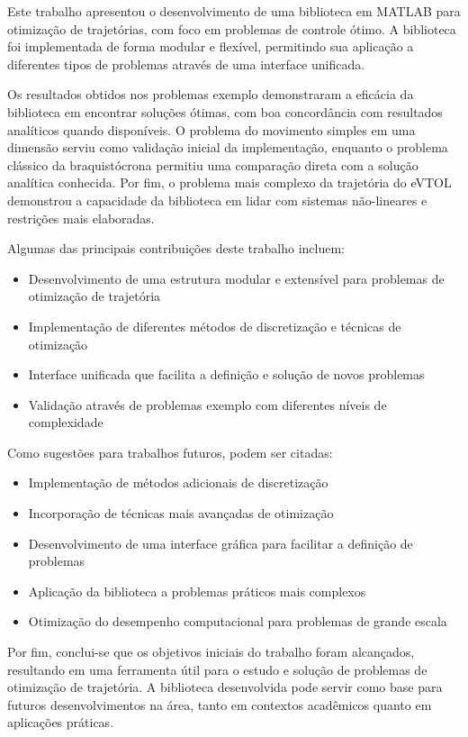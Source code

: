 Este trabalho apresentou o desenvolvimento de uma biblioteca em MATLAB para otimização de trajetórias, com foco em problemas de controle ótimo. A biblioteca foi implementada de forma modular e flexível, permitindo sua aplicação a diferentes tipos de problemas através de uma interface unificada.

Os resultados obtidos nos problemas exemplo demonstraram a eficácia da biblioteca em encontrar soluções ótimas, com boa concordância com resultados analíticos quando disponíveis. O problema do movimento simples em uma dimensão serviu como validação inicial da implementação, enquanto o problema clássico da braquistócrona permitiu uma comparação direta com a solução analítica conhecida. Por fim, o problema mais complexo da trajetória do eVTOL demonstrou a capacidade da biblioteca em lidar com sistemas não-lineares e restrições mais elaboradas.

Algumas das principais contribuições deste trabalho incluem:
\begin{itemize}
    \item Desenvolvimento de uma estrutura modular e extensível para problemas de otimização de trajetória
    \item Implementação de diferentes métodos de discretização e técnicas de otimização
    \item Interface unificada que facilita a definição e solução de novos problemas
    \item Validação através de problemas exemplo com diferentes níveis de complexidade
\end{itemize}

Como sugestões para trabalhos futuros, podem ser citadas:
\begin{itemize}
    \item Implementação de métodos adicionais de discretização
    \item Incorporação de técnicas mais avançadas de otimização
    \item Desenvolvimento de uma interface gráfica para facilitar a definição de problemas
    \item Aplicação da biblioteca a problemas práticos mais complexos
    \item Otimização do desempenho computacional para problemas de grande escala
\end{itemize}

Por fim, conclui-se que os objetivos iniciais do trabalho foram alcançados, resultando em uma ferramenta útil para o estudo e solução de problemas de otimização de trajetória. A biblioteca desenvolvida pode servir como base para futuros desenvolvimentos na área, tanto em contextos acadêmicos quanto em aplicações práticas.
